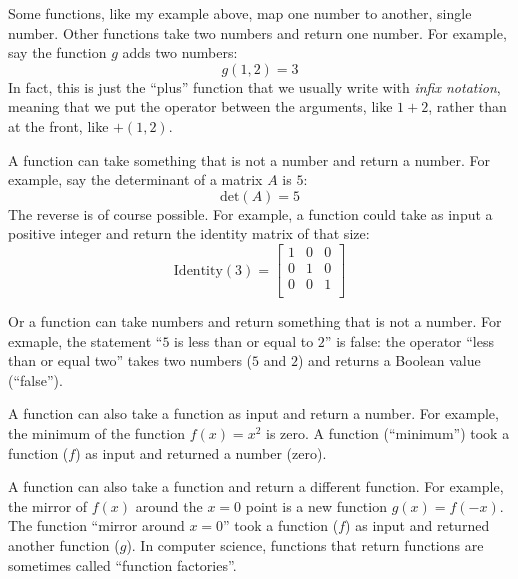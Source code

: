 Some functions, like my example above, map one number to another, single
number. Other functions take two numbers and return one number. For example, say
the function $g$ adds two numbers:
\begin{equation*}
g(1, 2) = 3
\end{equation*}
In fact, this is just the ``plus'' function that we usually write with \emph{infix
notation}, meaning that we put the operator between the arguments, like $1+2$,
rather than at the front, like $\mathord{+}(1, 2)$.

A function can take something that is not a number and return a number. For
example, say the determinant of a matrix $A$ is $5$:
\begin{equation*}
\mathrm{det}(A) = 5
\end{equation*}
The reverse is of course possible. For example, a function could take as input
a positive integer and return the identity matrix of that size:
\begin{equation*}
    \mathrm{Identity}(3) = \begin{bmatrix} 1 & 0 & 0 \\ 0 & 1 & 0 \\ 0 & 0 & 1 \\ \end{bmatrix}
\end{equation*}

Or a function can take numbers and return something that is not a number. For
exmaple, the statement ``$5$ is less than or equal to $2$'' is false: the
operator ``less than or equal two'' takes two numbers ($5$ and $2$) and returns
a Boolean value (``false'').

A function can also take a function as input and return a number. For example,
the minimum of the function $f(x) = x^2$ is zero. A function (``minimum'') took
a function ($f$) as input and returned a number (zero).

A function can also take a function and return a different function. For
example, the mirror of $f(x)$ around the $x=0$ point is a new function $g(x) =
f(-x)$. The function ``mirror around $x=0$'' took a function ($f$) as input and
returned another function ($g$). In computer science, functions that return
functions are sometimes called ``function factories''.

